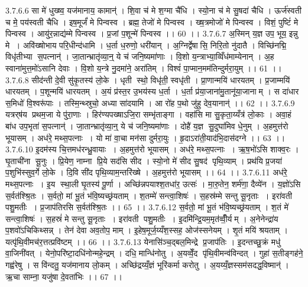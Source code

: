 3.7.6.6
सा मे॑ धुख्ष्व॒ यज॑मानाय॒ कामान्॑ । शि॒वा च॑ मे श॒ग्मा चै॑धि । स्यो॒ना च॑ मे सु॒षदा॑ चैधि । ऊर्ज॑स्वती च मे॒ पय॑स्वती चैधि । इष॒मूर्जं॑ मे पिन्वस्व । ब्रह्म॒ तेजो॑ मे पिन्वस्व । ख्ष॒त्रमोजो॑ मे पिन्वस्व । विशं॒ पुष्टिं॑ मे पिन्वस्व । आयु॑र॒न्नाद्य॑म्मे पिन्वस्व । प्र॒जां प॒शून्मे॑ पिन्वस्व ।। 60 ।।
3.7.6.7
अ॒स्मिन् य॒ज्ञ उप॒ भूय॒ इन्नु मे । अवि॑ख्षोभाय परि॒धीन्द॑धामि । ध॒र्ता ध॒रुणो॒ धरी॑यान् । अ॒ग्निर्द्वेषा॑सि॒ निरि॒तो नु॑दातै । विच्छि॑नद्मि॒ विधृ॑तीभ्या स॒पत्नान्॑ । जा॒तान्भ्रातृ॑व्या॒न्॒ ये च॑ जनि॒ष्यमा॑णाः । वि॒शो य॒न्त्राभ्या॒व्विँध॑माम्येनान् । अ॒ह स्वाना॑मुत्त॒मो॑ऽसानि देवाः । वि॒शो य॒न्त्रे नु॒दमा॑ने॒ अरा॑तिम् । विश्वं॑ पा॒प्मान॒मम॑तिन्दुर्मरा॒युम् ।। 61 ।।
3.7.6.8
सीद॑न्ती दे॒वी सु॑कृ॒तस्य॑ लो॒के । धृती स्थो॒ विधृ॑ती॒ स्वधृ॑ती । प्रा॒णान्मयि॑ धारयतम् । प्र॒जाम्मयि॑ धारयतम् । प॒शून्मयि॑ धारयतम् । अ॒यं प्र॑स्त॒र उ॒भय॑स्य ध॒र्ता । ध॒र्ता प्र॑या॒जाना॑मु॒तानू॑या॒जानाम् । स दा॑धार स॒मिधो॑ वि॒श्वरू॑पाः । तस्मि॒न्थ्स्रुचो॒ अध्या सा॑दयामि । आ रो॑ह प॒थो जु॑हु देव॒यानान्॑ ।। 62 ।।
3.7.6.9
यत्रर्‌ष॑य प्रथम॒जा ये पु॑रा॒णाः । हिर॑ण्यपख्षाऽजि॒रा सम्भृ॑ताङ्गा । वहा॑सि मा सु॒कृता॒य्यँत्र॑ लो॒काः । अवा॒हं बा॑ध उप॒भृता॑ स॒पत्नान्॑ । जा॒तान्भ्रातृ॑व्या॒न्॒ ये च॑ जनि॒ष्यमा॑णाः । दोहै॑ य॒ज्ञ सु॒दुघा॑मिव धे॒नुम् । अ॒हमुत्त॑रो भूयासम् । अध॑रे॒ मथ्स॒पत्नाः । यो मा॑ वा॒चा मन॑सा दुर्मरा॒युः । हृ॒दाऽरा॑ती॒याद॑भि॒दास॑दग्ने ।। 63 ।।
3.7.6.10
इ॒दम॑स्य चि॒त्तमध॑रन्ध्रु॒वायाः । अ॒हमुत्त॑रो भूयासम् । अध॑रे॒ मथ्स॒पत्नाः । ऋ॒ष॒भो॑ऽसि शाक्व॒रः । घृ॒ताची॑ना सू॒नुः । प्रि॒येण॒ नाम्ना प्रि॒ये सद॑सि सीद । स्यो॒नो मे॑ सीद सु॒षद॑ पृथि॒व्याम् । प्रथ॑यि प्र॒जया॑ प॒शुभि॑स्सुव॒र्गे लो॒के । दि॒वि सी॑द पृथि॒व्याम॒न्तरि॑ख्षे । अ॒हमुत्त॑रो भूयासम् ।। 64 ।।
3.7.6.11
अध॑रे॒ मथ्स॒पत्नाः । इ॒य स्था॒ली घृ॒तस्य॑ पू॒र्णा । अच्छि॑न्नपयाश्श॒तधा॑र॒ उत्सः॑ । मा॒रु॒तेन॒ शर्म॑णा॒ दैव्ये॑न । य॒ज्ञो॑ऽसि स॒र्वत॑श्श्रि॒तः । स॒र्वतो॒ मां भू॒तं भ॑वि॒ष्यच्छ्र॑यताम् । श॒तम्मे॑ सन्त्वा॒शिषः॑ । स॒हस्र॑म्मे सन्तु सू॒नृताः । इरा॑वती पशु॒मतीः । प्र॒जाप॑तिरसि स॒र्वत॑श्श्रि॒तः ।। 65 ।।
3.7.6.12
स॒र्वतो॒ मां भू॒तं भ॑वि॒ष्यच्छ्र॑यताम् । श॒तं मे॑ सन्त्वा॒शिषः॑ । स॒हस्रं॑ मे सन्तु सू॒नृताः । इरा॑वती पशु॒मतीः । इ॒दमि॑न्द्रि॒यम॒मृत॑व्वीँ॒र्यम् । अ॒नेनेन्द्रा॑य प॒शवो॑ऽचिकिथ्सन्न् । तेन॑ देवा अव॒तोप॒ माम् । इ॒हेष॒मूर्ज॒य्यँश॒स्सह॒ ओज॑स्सनेयम् । शृ॒तं मयि॑ श्रयताम् । यत्पृ॑थि॒वीमच॑र॒त्तत्प्रवि॑ष्टम् ।। 66 ।।
3.7.6.13
येनासि॑ञ्च॒द्बल॒मिन्द्रे प्र॒जाप॑तिः । इ॒दन्तच्छु॒क्रं मधु॑ वा॒जिनी॑वत् । येनो॒परि॑ष्टा॒दधि॑नोन्महे॒न्द्रम् । दधि॒ मान्धि॑नोतु । अ॒यव्वेँ॒द पृ॑थि॒वीमन्व॑विन्दत् । गुहा॑ स॒तीङ्गह॑ने॒ गह्व॑रेषु । स वि॑न्दतु॒ यज॑मानाय लो॒कम् । अच्छि॑द्रय्यँ॒ज्ञं भूरि॑कर्मा करोतु । अ॒यय्यँ॒ज्ञस्सम॑सदद्ध॒विष्मान्॑ । ऋ॒चा साम्ना॒ यजु॑षा दे॒वता॑भिः ।। 67 ।।
